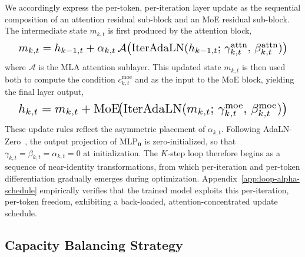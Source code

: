 We accordingly express the per-token, per-iteration layer update as the sequential composition of an attention residual sub-block and an MoE residual sub-block. The intermediate state $m_{k,t}$ is first produced by the attention block,
\begin{equation}
\resizebox{0.95\linewidth}{!}{$
  m_{k,t} = h_{k-1,t} + \alpha_{k,t} \, \mathcal{A}\big(\mathrm{IterAdaLN}(h_{k-1,t}; \, \gamma^{\text{attn}}_{k,t}, \, \beta^{\text{attn}}_{k,t})\big)
$}
\label{eq:layer-update-attn}
\end{equation}
where $\mathcal{A}$ is the MLA attention sublayer. This updated state $m_{k,t}$ is then used both to compute the condition $c^{\mathrm{moe}}_{k,t}$ and as the input to the MoE block, yielding the final layer output,
\begin{equation}
\resizebox{0.95\linewidth}{!}{$
  h_{k,t} = m_{k,t} + \mathrm{MoE}\!\big(
         \mathrm{IterAdaLN}(m_{k,t};\, \gamma^{\mathrm{moe}}_{k,t},\, \beta^{\mathrm{moe}}_{k,t})
       \big)
$}
\label{eq:layer-update-attn}
\end{equation}
These update rules reflect the asymmetric placement of $\alpha_{k,t}$. Following AdaLN-Zero~\cite{peebles2023scalable}, the output projection of $\mathrm{MLP}_{\mathbf{0}}$ is zero-initialized, so that $\gamma_{k,t}=\beta_{k,t}=\alpha_{k,t}=0$ at initialization. The $K$-step loop therefore begins as a sequence of near-identity transformations, from which per-iteration and per-token differentiation gradually emerges during optimization. Appendix~\ref{app:loop-alpha-schedule} empirically verifies that the trained model exploits this per-iteration, per-token freedom, exhibiting a back-loaded, attention-concentrated update schedule.





\subsection{Capacity Balancing Strategy}
\label{sec:method-budget}

